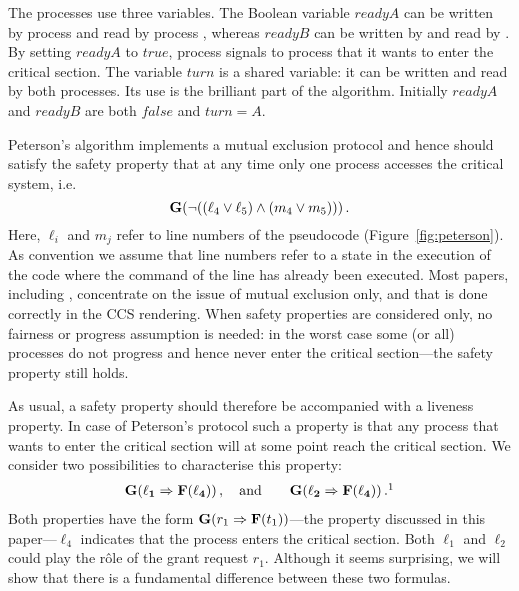 \documentclass[smallcondensed]{svjour3}
\newcommand{\Fig}[1]{Figure~\ref{fig:#1}}
\newcounter {part}
\begin{document}
The processes use three variables. The Boolean variable $readyA$ can be
written by process \procA and read by process \procB, whereas $readyB$ can be
written by \procB and read by \procA. By setting $readyA$ to $true$, process
\procA signals to process \procB that it wants to enter the critical
section. The variable $turn$ is a shared variable: it can be written
and read by both processes. Its use is the brilliant part of the algorithm.
Initially $readyA$ and $readyB$ are both $false$ and $turn = A$.

Peterson's algorithm implements a mutual exclusion protocol and hence 
should satisfy the safety property that at any time only one process accesses the critical system, i.e.\
\[{\bf G} (\neg((\ell_{4}\vee\ell_{5})\wedge (m_{4}\vee m_{5})))\,.\]
Here, $\ell_{i}$ and $m_{j}$ refer to line numbers of the pseudocode (\Fig{peterson}). 
As convention we assume that line numbers refer to a state in the execution of the code where the 
command of the line has already been executed.
Most papers, including \cite{Bouali91,AcetoEtAl07},  
concentrate on the issue of mutual
exclusion only, and that is done correctly in the CCS rendering.
When safety properties are considered only, no fairness or progress assumption is needed: 
in the worst case some (or all) processes do not progress and hence never enter the critical section---the safety property still holds. 

As usual, a safety property should therefore be accompanied with a liveness property.
In case of Peterson's protocol such a property is that any process
that wants to enter the critical section will at
some point reach the critical section. We consider two possibilities to characterise this property:
\begin{eqnarray*}
\bf{G}(\ell_{1}\Rightarrow{\bf F}(\ell_{4}))\,,\quad\mbox{and}\qquad
\bf{G}(\ell_{2}\Rightarrow{\bf F}(\ell_{4}))\,.
\footnotemark
\end{eqnarray*}
Both properties have the form ${\bf G} (r_{1}\Rightarrow {\bf F}(t_1))$---the property discussed in this paper---$\ell_{4}$ indicates that the process enters the critical section. Both $\ell_{1}$ and $\ell_{2}$ could 
play the r\^ole of the grant request $r_{1}$.
Although it seems surprising, we will show that there is a fundamental difference between these two formulas.
\end{document}
